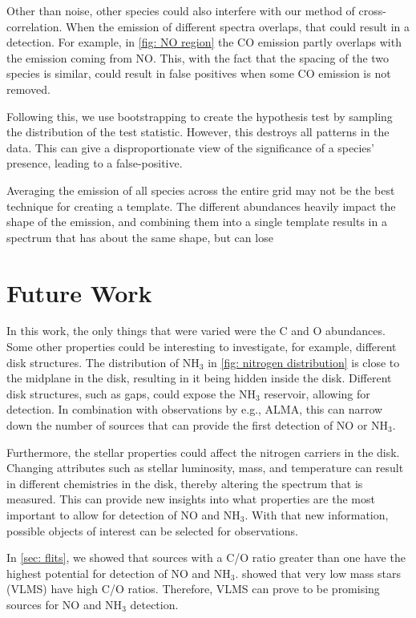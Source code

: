 \documentclass[oneside, single, authoryear, semicolon, 12pt]{lion-msc}
\newcommand{\4}{$_4$}
\newcommand{\3}{$_3$}
\newcommand{\2}{$_2$}
\begin{document}
Other than noise, other species could also interfere with our method of cross-correlation. When the emission of different spectra overlaps, that could result in a detection. For example, in \autoref{fig: NO region} the CO emission partly overlaps with the emission coming from NO. This, with the fact that the spacing of the two species is similar, could result in false positives when some CO emission is not removed. 

Following this, we use bootstrapping to create the hypothesis test by sampling the distribution of the test statistic. However, this destroys all patterns in the data. This can give a disproportionate view of the significance of a species' presence, leading to a false-positive.

Averaging the emission of all species across the entire grid may not be the best technique for creating a template. The different abundances heavily impact the shape of the emission, and combining them into a single template results in a spectrum that has about the same shape, but can lose 

\section{Future Work}
In this work, the only things that were varied were the C and O abundances. Some other properties could be interesting to investigate, for example, different disk structures. The distribution of NH\3 in \autoref{fig: nitrogen distribution} is close to the midplane in the disk, resulting in it being hidden inside the disk. Different disk structures, such as gaps, could expose the NH\3 reservoir, allowing for detection. In combination with observations by e.g., ALMA, this can narrow down the number of sources that can provide the first detection of NO or NH\3.

Furthermore, the stellar properties could affect the nitrogen carriers in the disk. Changing attributes such as stellar luminosity, mass, and temperature can result in different chemistries in the disk, thereby altering the spectrum that is measured. This can provide new insights into what properties are the most important to allow for detection of NO and NH\3. With that new information, possible objects of interest can be selected for observations. 

In \autoref{sec: flits}, we showed that sources with a C/O ratio greater than one have the highest potential for detection of NO and NH\3. \cite{Arabhavi_2024} showed that very low mass stars (VLMS) have high C/O ratios. Therefore, VLMS can prove to be promising sources for NO and NH\3 detection. 
\end{document}
